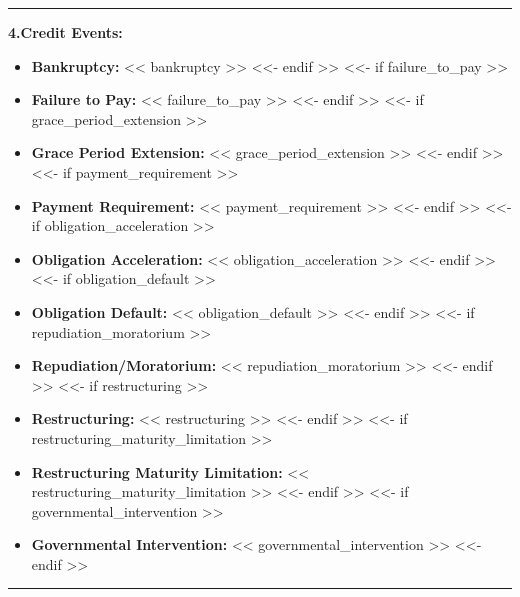 \documentclass[11pt, a4paper]{article}
\begin{document}
\vspace{0.5cm}
\hrule
\vspace{0.5cm}


\noindent \textbf{4.\quad Credit Events:}
\begin{itemize}[leftmargin=2cm, label={}, itemsep=3pt]
<<- if bankruptcy >>
    \item \textbf{Bankruptcy:} << bankruptcy >>
<<- endif >>
<<- if failure_to_pay >>
    \item \textbf{Failure to Pay:} << failure_to_pay >>
<<- endif >>
<<- if grace_period_extension >>
    \item \textbf{Grace Period Extension:} << grace_period_extension >>
<<- endif >>
<<- if payment_requirement >>
    \item \textbf{Payment Requirement:} << payment_requirement >>
<<- endif >>
<<- if obligation_acceleration >>
    \item \textbf{Obligation Acceleration:} << obligation_acceleration >>
<<- endif >>
<<- if obligation_default >>
    \item \textbf{Obligation Default:} << obligation_default >>
<<- endif >>
<<- if repudiation_moratorium >>
    \item \textbf{Repudiation/Moratorium:} << repudiation_moratorium >>
<<- endif >>
<<- if restructuring >>
    \item \textbf{Restructuring:} << restructuring >>
<<- endif >>
<<- if restructuring_maturity_limitation >>
    \item \textbf{Restructuring Maturity Limitation:} << restructuring_maturity_limitation >>
<<- endif >>
<<- if governmental_intervention >>
    \item \textbf{Governmental Intervention:} << governmental_intervention >>
<<- endif >>
\end{itemize}

\vspace{0.5cm}
\hrule
\vspace{0.5cm}

\end{document}
